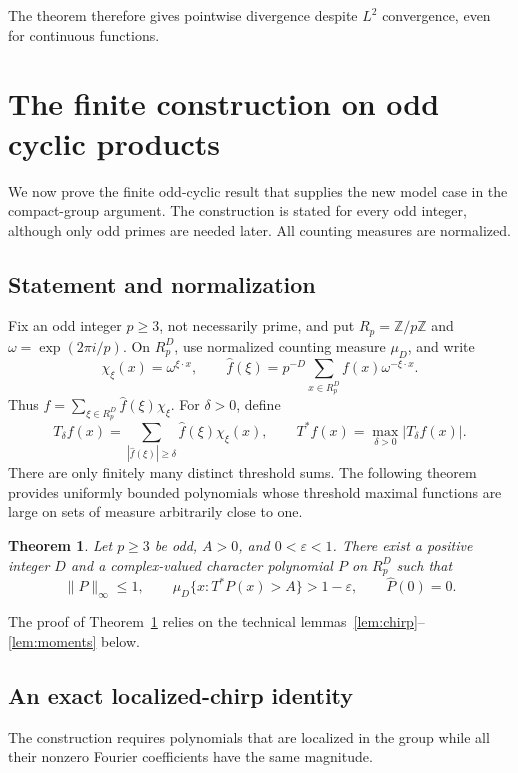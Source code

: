 \documentclass[11pt]{amsart}
\newtheorem{theorem}{Theorem}[section]
\theoremstyle{definition}
\theoremstyle{remark}
\newcommand{\R}{R}
\begin{document}
The theorem therefore gives pointwise divergence despite
\(L^2\) convergence, even for continuous functions.

\section{The finite construction on odd cyclic products}\label{sec:odd}

We now prove the finite odd-cyclic result that supplies the new
model case in the compact-group argument. The construction is stated
for every odd integer, although only odd primes are needed later.
All counting measures are normalized.

\subsection{Statement and normalization}

Fix an odd integer \(p\geq3\), not necessarily prime, and put
\(\R_p=\mathbb Z/p\mathbb Z\) and \(\omega=\exp(2\pi i/p)\).
On \(\R_p^D\), use normalized
counting measure \(\mu_D\), and write
\[
 \chi_\xi(x)=\omega^{\xi\cdot x},\qquad
 \widehat f(\xi)=p^{-D}\sum_{x\in\R_p^D}f(x)\omega^{-\xi\cdot x}.
\]
Thus \(f=\sum_{\xi\in\R_p^D}\widehat f(\xi)\chi_\xi\).
For \(\delta>0\), define
\[
 T_\delta f(x)=
 \sum_{|\widehat f(\xi)|\geq\delta}\widehat f(\xi)\chi_\xi(x),
 \qquad
 T^*f(x)=\max_{\delta>0}|T_\delta f(x)|.
\]
There are only finitely many distinct threshold sums. The following theorem
provides uniformly bounded polynomials whose threshold maximal functions are
large on sets of measure arbitrarily close to one.

\begin{theorem}\label{thm:finite}
Let \(p\geq3\) be odd, \(A>0\), and \(0<\varepsilon<1\). There exist a positive integer
\(D\) and a complex-valued character polynomial \(P\) on \(\R_p^D\)
such that
\[
 \|P\|_\infty\leq1,\qquad
 \mu_D\{x:T^*P(x)>A\}>1-\varepsilon,\qquad
 \widehat P(0)=0.
\]
\end{theorem}
The proof of Theorem~\ref{thm:finite} relies on the technical
lemmas~\ref{lem:chirp}--\ref{lem:moments} below.
\subsection{An exact localized-chirp identity}

The construction requires polynomials that are localized in the group while
all their nonzero Fourier coefficients have the same magnitude.
\end{document}
